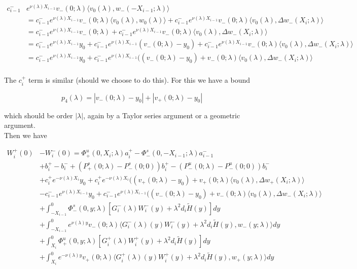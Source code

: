 \documentclass[12pt]{article}
\begin{document}
\begin{enumerate}
\begin{align*}
c_{i-1}^- &e^{\nu(\lambda)X_{i-1}} v_-(0; \lambda) \langle v_0(\lambda), w_-(-X_{i-1}; \lambda) \rangle \\
&= c_{i-1}^- e^{\nu(\lambda)X_{i-1}} v_-(0; \lambda) \langle v_0(\lambda), w_0(\lambda) \rangle + c_{i-1}^- e^{\nu(\lambda)X_{i-1}} v_-(0; \lambda) \langle v_0(\lambda), \Delta w_-(X_i; \lambda) \rangle \\
&= c_{i-1}^- e^{\nu(\lambda)X_{i-1}} v_-(0; \lambda) + c_{i-1}^- e^{\nu(\lambda)X_{i-1}} v_-(0; \lambda) \langle v_0(\lambda), \Delta w_-(X_i; \lambda) \rangle \\
&= c_{i-1}^- e^{\nu(\lambda)X_{i-1}} y_0 +  c_{i-1}^- e^{\nu(\lambda)X_{i-1}} (v_-(0; \lambda) - y_0) + c_{i-1}^- e^{\nu(\lambda)X_{i-1}} v_-(0; \lambda) \langle v_0(\lambda), \Delta w_-(X_i; \lambda) \rangle \\
&= c_{i-1}^- e^{\nu(\lambda)X_{i-1}} y_0 + c_{i-1}^- e^{\nu(\lambda)X_{i-1}}( (v_-(0; \lambda) - y_0) + v_-(0; \lambda) \langle v_0(\lambda), \Delta w_-(X_i; \lambda) \rangle \\
\end{align*} 

The $c_i^+$ term is similar (should we choose to do this). For this we have a bound

\[
p_4(\lambda) = |v_-(0; \lambda) - y_0| + |v_+(0; \lambda) - y_0|
\]

which should be order $|\lambda|$, again by a Taylor series argument or a geometric argument.\\

Then we have

\begin{align*}
W_i^+(0) &- W_i^-(0) = \Phi^u_+(0, X_i; \lambda)a_i^+ - \Phi^s_-(0, -X_{i-1}; \lambda)a_{i-1}^- \\
&+ b_i^+ - b_i^- + (P^s_+(0; \lambda) - P^s_-(0; 0))b_i^+  - (P^u_-(0; \lambda) - P^u_-(0; 0))b_i^- \\
&+ c_i^+ e^{-\nu(\lambda)X_i} y_0 + c_i^+ e^{-\nu(\lambda)X_i}( (v_+(0; \lambda) - y_0) + v_+(0; \lambda) \langle v_0(\lambda), \Delta w_+(X_i; \lambda) \rangle\\
&- c_{i-1}^- e^{\nu(\lambda)X_{i-1}} y_0 + c_{i-1}^- e^{\nu(\lambda)X_{i-1}}( (v_-(0; \lambda) - y_0) + v_-(0; \lambda) \langle v_0(\lambda), \Delta w_-(X_i; \lambda) \rangle \\
&+ \int_{-X_{i-1}}^0 \Phi^s_-(0, y; \lambda) [ G_i^-(\lambda)W_i^-(y) + \lambda^2 d_i \tilde{H}(y) ] dy \\
&+ \int_{-X_{i-1}}^0
e^{\nu(\lambda)y} v_-(0; \lambda) \langle G_i^-(\lambda)(y)W_i^-(y) + \lambda^2 d_i \tilde{H}(y), w_-(y; \lambda) \rangle dy \\
&+ \int_{X_i}^0 \Phi^u_+(0, y; \lambda) [ G_i^+(\lambda)W_i^+(y) + \lambda^2 d_i \tilde{H}(y) ] dy \\
&+ \int_{X_i}^0 e^{-\nu(\lambda)y} v_+(0; \lambda) \langle G_i^+(\lambda)(y)W_i^+(y) + \lambda^2 d_i \tilde{H}(y), w_+(y; \lambda) \rangle dy
\end{align*}


\end{enumerate}
\end{document}
